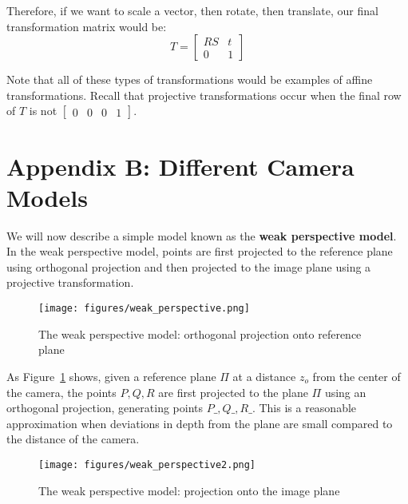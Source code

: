 \documentclass[a4paper, 12pt]{article}
\renewcommand\emph{\textbf}
\begin{document}
Therefore, if we want to scale a vector, then rotate, then translate, our final transformation matrix would be:
\[T = \begin{bmatrix}
RS & t \\ 0 & 1
\end{bmatrix}\]

Note that all of these types of transformations would be examples of affine transformations. Recall that projective transformations occur when the final row of $T$ is not $\begin{bmatrix}
0 & 0 &0 &1
\end{bmatrix}$.

\section{Appendix B: Different Camera Models}
We will now describe a simple model known as the \emph{weak perspective model}. In the weak perspective model, points are first projected to the reference plane using orthogonal projection and then projected to the image plane using a projective transformation.
\begin{figure}[h!]
\centering
\texttt{[image: figures/weak\_perspective.png]}
\caption{The weak perspective model: orthogonal projection onto reference plane}
\label{fig:weak_perspective}
\end{figure}

As Figure~\ref{fig:weak_perspective} shows, given a reference plane $\Pi$ at a distance $z_o$ from the center of the camera, the points $P,Q,R$ are first projected to the plane $\Pi$ using an orthogonal projection, generating points $P\_, Q\_, R\_$.  This is a reasonable approximation when deviations in depth from the plane are small compared to the distance of the camera. 

\begin{figure}[h!]
\centering
\texttt{[image: figures/weak\_perspective2.png]}
\caption{The weak perspective model: projection onto the image plane}
\label{fig:weak_perspective2}
\end{figure}
\end{document}
